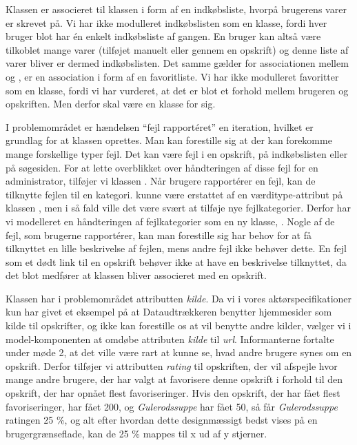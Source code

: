 Klassen  er associeret til klassen  i form af en indkøbsliste, hvorpå brugerens varer er skrevet på. Vi har ikke modulleret indkøbslisten som en klasse, fordi hver bruger blot har én enkelt indkøbsliste af gangen. En bruger kan altså være tilkoblet mange varer (tilføjet manuelt eller gennem en opskrift) og denne liste af varer bliver er dermed indkøbslisten. Det samme gælder for associationen mellem  og , er en association i form af en favoritliste. Vi har ikke modulleret favoritter som en klasse, fordi vi har vurderet, at det er blot et forhold mellem brugeren og opskriften. Men derfor skal  være en klasse for sig.

I problemområdet er hændelsen ``fejl rapportéret'' en iteration, hvilket er grundlag for at klassen  oprettes. Man kan forestille sig at der kan forekomme mange forskellige typer fejl. Det kan være fejl i en opskrift, på indkøbslisten eller på søgesiden. For at lette overblikket over håndteringen af disse fejl for en administrator, tilføjer vi klassen . Når brugere rapportérer en fejl, kan de tilknytte fejlen til en kategori.  kunne være erstattet af en værditype-attribut på klassen , men i så fald ville det være svært at tilføje nye fejlkategorier. Derfor har vi modelleret en håndteringen af fejlkategorier som en ny klasse, . Nogle af de fejl, som brugerne rapportérer, kan man forestille sig har behov for at få tilknyttet en lille beskrivelse af fejlen, mens andre fejl ikke behøver dette. En fejl som \fx et dødt link til en opskrift behøver ikke at have en beskrivelse tilknyttet, da det blot medfører at klassen  bliver associeret med en opskrift.

Klassen  har i problemområdet attributten \textit{kilde}. Da vi i vores aktørspecifikationer kun har givet et eksempel på at Dataudtrækkeren benytter hjemmesider som kilde til opskrifter, og ikke kan forestille os at \Foodl{} vil benytte andre kilder, vælger vi i model-komponenten at omdøbe attributen \textit{kilde} til \textit{url}. Informanterne fortalte under møde 2, at det ville være rart at kunne se, hvad andre brugere synes om en opskrift. Derfor tilføjer vi attributten \textit{rating} til opskriften, der vil afspejle hvor mange andre brugere, der har valgt at favorisere denne opskrift i forhold til den opskrift, der har opnået flest favoriseringer. Hvis den opskrift, der har fået flest favoriseringer, har fået 200, og \textit{Gulerodssuppe} har fået 50, så får \textit{Gulerodssuppe} ratingen 25 \%, og alt efter hvordan dette designmæssigt bedst vises på en brugergrænseflade, kan de 25 \% mappes til \fx x ud af y stjerner.
